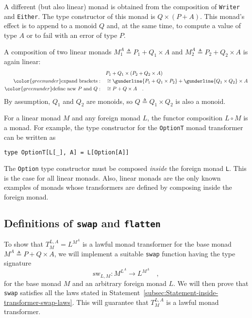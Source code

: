 A different (but also linear) monad is obtained from the composition
of \lstinline!Writer! and \lstinline!Either!. The type constructor
of this monad is $Q\times\left(P+A\right)$. This monad\textsf{'}s effect is
to append to a monoid $Q$ and, at the same time, to compute a value
of type $A$ or to fail with an error of type $P$.

A composition of two linear monads $M_{1}^{A}\triangleq P_{1}+Q_{1}\times A$
and $M_{2}^{A}\triangleq P_{2}+Q_{2}\times A$ is again linear:
\begin{align*}
 & P_{1}+Q_{1}\times\left(P_{2}+Q_{2}\times A\right)\\
{\color{greenunder}\text{expand brackets}:}\quad & \cong\gunderline{P_{1}+Q_{1}\times P_{2}}+\gunderline{Q_{1}\times Q_{2}}\times A\\
{\color{greenunder}\text{define new }P\text{ and }Q:}\quad & \cong P+Q\times A\quad.
\end{align*}
By assumption, $Q_{1}$ and $Q_{2}$ are monoids, so $Q\triangleq Q_{1}\times Q_{2}$
is also a monoid.

For a linear monad $M$ and any foreign monad $L$, the functor composition
$L\circ M$ is a monad. For example, the type constructor for the
\lstinline!OptionT! monad transformer can be written as
\begin{lstlisting}
type OptionT[L[_], A] = L[Option[A]]
\end{lstlisting}
The \lstinline!Option! type constructor must be composed \emph{inside}
the foreign monad \lstinline!L!. This is the case for all linear
monads. Also, linear monads are the only known examples of monads
whose transformers are defined by composing inside the foreign monad.

\subsection{Definitions of \texttt{swap} and \texttt{flatten}}

To show that $T_{M}^{L,A}=L^{M^{A}}$ is a lawful monad transformer
for the base monad $M^{A}\triangleq P+Q\times A$, we will implement
a suitable \lstinline!swap! function having the type signature
\[
\text{sw}_{L,M}:M^{L^{A}}\rightarrow L^{M^{A}}\quad,
\]
for the base monad $M$ and an arbitrary foreign monad $L$. We will
then prove that \lstinline!swap! satisfies all the laws stated in
Statement~\ref{subsec:Statement-inside-transformer-swap-laws}. This
will guarantee that $T_{M}^{L,A}$ is a lawful monad transformer.


